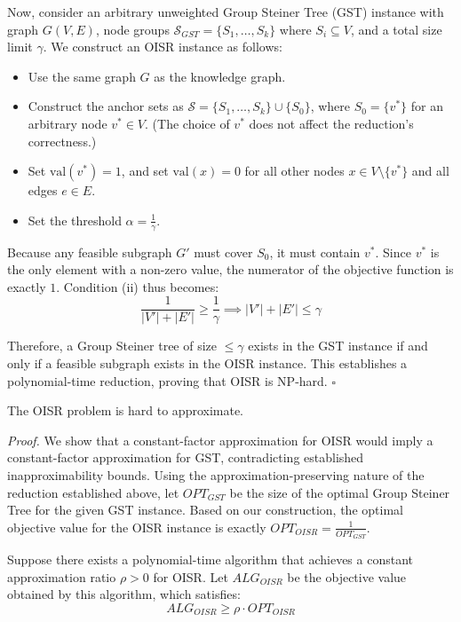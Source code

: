 Now, consider an arbitrary unweighted Group Steiner Tree (GST) instance with graph $G(V, E)$, node groups $\mathcal{S}_{GST} = \{S_1, \dots, S_k\}$ where $S_i \subseteq V$, and a total size limit $\gamma$. We construct an OISR instance as follows:
\begin{itemize}
    \item Use the same graph $G$ as the knowledge graph.
    \item Construct the anchor sets as $\mathcal{S} = \{S_1, \dots, S_k\} \cup \{S_0\}$, where $S_0 = \{v^*\}$ for an arbitrary node $v^* \in V$. (The choice of $v^*$ does not affect the reduction's correctness.)
    \item Set $\mathrm{val}(v^*) = 1$, and set $\mathrm{val}(x) = 0$ for all other nodes $x \in V \setminus \{v^*\}$ and all edges $e \in E$.
    \item Set the threshold $\alpha = \frac{1}{\gamma}$.
\end{itemize}

Because any feasible subgraph $G'$ must cover $S_0$, it must contain $v^*$. Since $v^*$ is the only element with a non-zero value, the numerator of the objective function is exactly $1$. Condition (ii) thus becomes:
\begin{equation*}
    \frac{1}{|V'| + |E'|} \ge \frac{1}{\gamma} \implies |V'| + |E'| \le \gamma
\end{equation*}

Therefore, a Group Steiner tree of size $\le \gamma$ exists in the GST instance if and only if a feasible subgraph exists in the OISR instance. This establishes a polynomial-time reduction, proving that OISR is NP-hard. \hfill$\square$

\begin{thm}\label{thm:apxhard}
The OISR problem is hard to approximate.
\end{thm}

\textit{Proof.} We show that a constant-factor approximation for OISR would imply a constant-factor approximation for GST, contradicting established inapproximability bounds.
Using the approximation-preserving nature of the reduction established above, let $OPT_{GST}$ be the size of the optimal Group Steiner Tree for the given GST instance. Based on our construction, the optimal objective value for the OISR instance is exactly $OPT_{OISR} = \frac{1}{OPT_{GST}}$.

Suppose there exists a polynomial-time algorithm that achieves a constant approximation ratio $\rho > 0$ for OISR. Let $ALG_{OISR}$ be the objective value obtained by this algorithm, which satisfies:
\begin{equation}
    ALG_{OISR} \ge \rho \cdot OPT_{OISR}
\end{equation}

